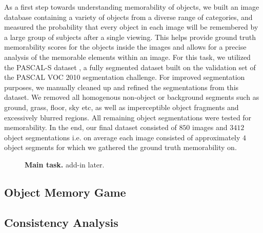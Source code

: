 As a first step towards understanding memorability of objects, we built an image database containing a variety of objects from a diverse range of categories, and measured the probability that every object in each image will be remembered by a large group of subjects after a single viewing. This helps provide ground truth memorability scores for the objects inside the images and allows for a precise analysis of the memorable elements within an image. For this task, we utilized the PASCAL-S dataset \cite{yin14}, a fully segmented dataset built on the validation set of the PASCAL VOC 2010 \cite{pascal10} segmentation challenge. For improved segmentation purposes, we manually cleaned up and refined the segmentations from this dataset. We removed all homogenous non-object or background segments such as ground, grass, floor, sky etc, as well as imperceptible object fragments and excessively blurred regions. All remaining object segmentations were tested for memorability. In the end, our final dataset consisted of $850$ images and $3412$ object segmentations i.e. on average each image consisted of approximately $4$ object segments for which we gathered the ground truth memorability on.

\begin{figure}[!htb]
\centering
{}
\vspace{-5mm}\caption{\footnotesize\textbf{Main task.} add-in later. }\label{fig:mainTask}
\end{figure}

\subsection{Object Memory Game}


\subsection{Consistency Analysis}

